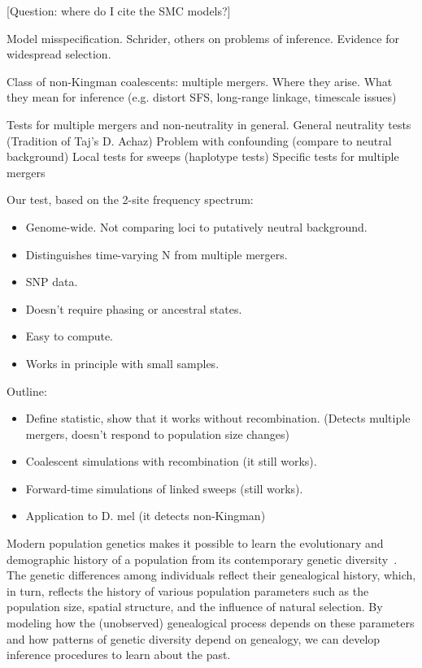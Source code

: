\documentclass[11pt, letterpaper]{article}   	%
\begin{document}
[Question: where do I cite the SMC models?]

Model misspecification. Schrider, others on problems of inference. Evidence for widespread selection.

Class of non-Kingman coalescents: multiple mergers. Where they arise. What they mean for inference (e.g. distort SFS, long-range linkage, timescale issues)

Tests for multiple mergers and non-neutrality in general.
General neutrality tests (Tradition of Taj's D. Achaz)
Problem with confounding (compare to neutral background)
Local tests for sweeps (haplotype tests)
Specific tests for multiple mergers

Our test, based on the 2-site frequency spectrum:
\begin{itemize}
\item Genome-wide. Not comparing loci to putatively neutral background.
\item Distinguishes time-varying N from multiple mergers.
\item SNP data.
\item Doesn't require phasing or ancestral states.
\item Easy to compute.
\item Works in principle with small samples.
\end{itemize}

Outline:
\begin{itemize}
\item Define statistic, show that it works without recombination. (Detects multiple mergers, doesn't respond to population size changes)
\item Coalescent simulations with recombination (it still works).
\item Forward-time simulations of linked sweeps (still works).
\item Application to D. mel (it detects non-Kingman)
\end{itemize}

Modern population genetics makes it possible to learn the evolutionary and demographic history of a population from its contemporary genetic diversity~\autocite{Hahn2018}.
The genetic differences among individuals reflect their genealogical history, which, in turn, reflects the history of various population parameters such as the population size, spatial structure, and the influence of natural selection.
By modeling how the (unobserved) genealogical process depends on these parameters and how patterns of genetic diversity depend on genealogy, we can develop inference procedures to learn about the past.
\end{document}
